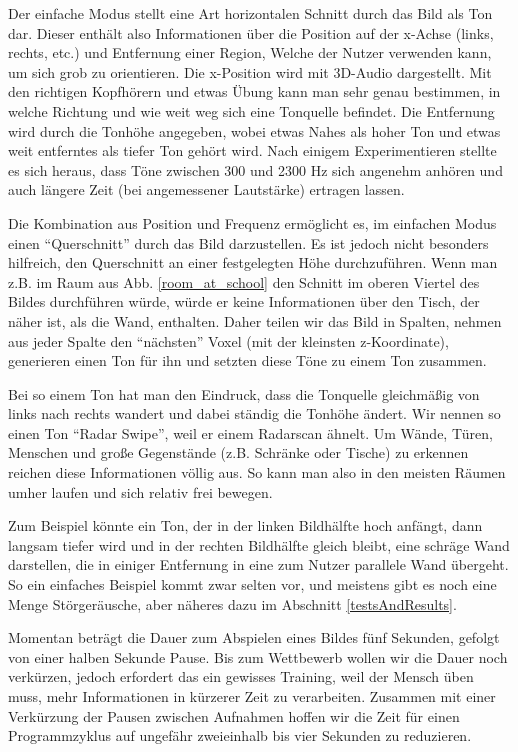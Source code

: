 \documentclass[a4paper,12pt,ngerman]{scrartcl}
\begin{document}
Der einfache Modus stellt eine Art horizontalen Schnitt durch das Bild als Ton dar. Dieser enthält also Informationen
über die Position auf der x-Achse (links, rechts, etc.) und Entfernung einer Region, Welche der Nutzer verwenden kann,
um sich grob zu orientieren. Die x-Position wird mit 3D-Audio dargestellt. Mit den richtigen Kopfhörern und etwas Übung
kann man sehr genau bestimmen, in welche Richtung und wie weit weg sich eine Tonquelle befindet. Die Entfernung wird
durch die Tonhöhe angegeben, wobei etwas Nahes als hoher Ton und etwas weit entferntes als tiefer Ton gehört wird.
Nach einigem Experimentieren stellte es sich heraus, dass Töne zwischen 300 und 2300 Hz sich angenehm anhören und auch
längere Zeit (bei angemessener Lautstärke) ertragen lassen. \par 
Die Kombination aus Position und Frequenz ermöglicht es, im
einfachen Modus einen \enquote{Querschnitt} durch das Bild darzustellen. Es ist jedoch nicht besonders hilfreich, 
den Querschnitt an einer festgelegten Höhe durchzuführen. Wenn man z.B. im Raum aus Abb. \ref{room_at_school} den Schnitt im oberen Viertel des Bildes durchführen würde, würde er keine Informationen über den Tisch, der näher ist, als
die Wand, enthalten. Daher teilen wir das Bild in Spalten, nehmen aus jeder Spalte den \enquote{nächsten} Voxel 
(mit der kleinsten z-Koordinate), generieren einen Ton für ihn und setzten diese Töne zu einem Ton zusammen. \par
Bei so einem Ton hat man den Eindruck, dass die Tonquelle gleichmäßig von links nach rechts wandert und dabei ständig
die Tonhöhe ändert. Wir nennen so einen Ton \enquote{Radar Swipe}, weil er einem Radarscan ähnelt.
Um Wände, Türen, Menschen und große Gegenstände (z.B. Schränke oder Tische) zu erkennen reichen diese Informationen völlig aus. So kann man also in den meisten Räumen umher laufen und sich relativ frei bewegen.\par
Zum Beispiel könnte ein Ton, der in der linken Bildhälfte hoch anfängt, dann langsam tiefer wird und 
in der rechten Bildhälfte gleich bleibt, eine schräge Wand darstellen, die in einiger Entfernung in eine
zum Nutzer parallele Wand übergeht. So ein einfaches Beispiel kommt zwar selten vor, und meistens gibt es
noch eine Menge Störgeräusche, aber näheres dazu im Abschnitt \ref{testsAndResults}.\par 
Momentan beträgt die Dauer zum Abspielen eines Bildes fünf Sekunden, gefolgt von einer halben Sekunde 
Pause. Bis zum Wettbewerb wollen wir die Dauer noch verkürzen, jedoch erfordert das ein gewisses 
Training, weil der Mensch üben muss, mehr Informationen in kürzerer Zeit zu verarbeiten. Zusammen mit 
einer Verkürzung der Pausen zwischen Aufnahmen hoffen wir die Zeit für einen Programmzyklus auf ungefähr
zweieinhalb bis vier Sekunden zu reduzieren. 
\end{document}
